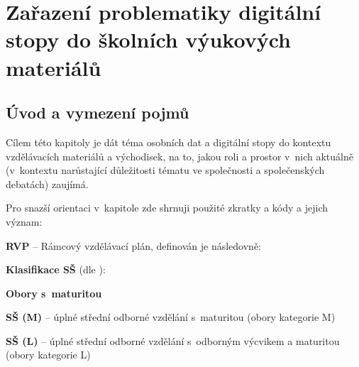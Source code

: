 \chapter{Zařazení problematiky digitální stopy do školních výukových materiálů}

\section*{Úvod a vymezení pojmů}

Cílem této kapitoly je dát téma osobních dat a digitální stopy do kontextu vzdělávacích materiálů a východisek, na to, jakou roli a prostor v~nich aktuálně (v~kontextu narůstající důležitosti tématu ve společnosti a společenských debatách) zaujímá. 

Pro snazší orientaci v~kapitole zde shrnuji použité zkratky a kódy a jejich význam:

\textbf{RVP} -- Rámcový vzdělávací plán, definován \citep{rvp} je následovně:

\begin{displayquote}
 \citep{rvp} 
\end{displayquote}

\textbf{Klasifikace SŠ} (dle \citep{stredni-vzdelavani}):

\textbf{Obory s~maturitou}

\textbf{SŠ (M)} -- úplné střední odborné vzdělání s~maturitou (obory kategorie M)

\begin{displayquote}
 \citep{stredni-vzdelavani}
\end{displayquote}

\textbf{SŠ (L)} -- úplné střední odborné vzdělání s~odborným výcvikem a maturitou (obory kategorie L)

\begin{displayquote}
 \citep{stredni-vzdelavani}
\end{displayquote}

